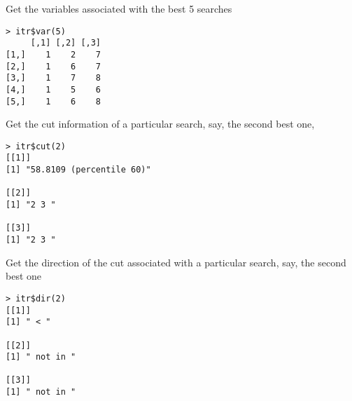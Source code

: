 Get the variables associated with the best 5 searches
\begin{verbatim}
> itr$var(5)
     [,1] [,2] [,3]
[1,]    1    2    7
[2,]    1    6    7
[3,]    1    7    8
[4,]    1    5    6
[5,]    1    6    8
\end{verbatim} 
Get the cut information of a particular search, say, the second best one,
\begin{verbatim}
> itr$cut(2)
[[1]]
[1] "58.8109 (percentile 60)"

[[2]]
[1] "2 3 "

[[3]]
[1] "2 3 "
\end{verbatim}
Get the direction of the cut associated with a particular search, say, the second best one
\begin{verbatim}
> itr$dir(2)
[[1]]
[1] " < "

[[2]]
[1] " not in "

[[3]]
[1] " not in "
\end{verbatim}
